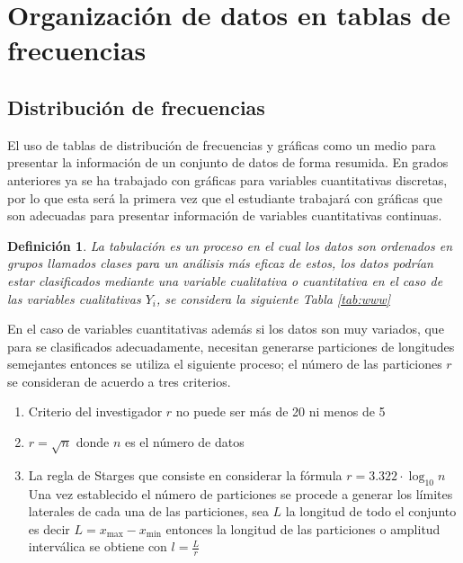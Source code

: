 \documentclass[a4paper]{report}
\newtheorem{defn}[thm]{Definición}
\begin{document}
\section{Organización de datos en tablas de frecuencias}

\subsection{Distribución de frecuencias}
El uso de tablas de distribución de frecuencias y gráficas como un medio para presentar la información
de un conjunto de datos de forma resumida. En grados anteriores ya se ha trabajado con gráficas para
variables cuantitativas discretas, por lo que esta será la primera vez que el estudiante trabajará con
gráficas que son adecuadas para presentar información de variables cuantitativas continuas.

\begin{defn}
	La tabulación es un proceso en el cual los datos son ordenados en grupos llamados clases para un análisis más eficaz de estos, los datos podrían estar clasificados mediante una variable cualitativa o cuantitativa en el caso de las variables cualitativas $Y_i$, se considera la siguiente Tabla \ref{tab:www}
\end{defn}


En el caso de variables cuantitativas además si los datos son muy variados, que para se clasificados adecuadamente, necesitan generarse particiones de longitudes semejantes entonces se utiliza el siguiente proceso; el número de las particiones $r$ se consideran de acuerdo a tres criterios.
\begin{enumerate}
	\item Criterio del investigador $r$ no puede ser más de 20 ni menos de 5
	\item $r=\sqrt{n}$ donde $n$ es el número de datos
	\item La regla de Starges que consiste en considerar la fórmula $r=3.322\cdot\log_{10} n$ Una vez establecido el número de particiones se procede a generar los límites laterales de cada una de las particiones, sea $L$ la longitud de todo el conjunto es decir $L=x_{\text{max}}-x_{\text{min}}$ entonces la longitud de las particiones o amplitud interválica se obtiene con $l=\frac{L}{r}$
\end{enumerate}
\end{document}
